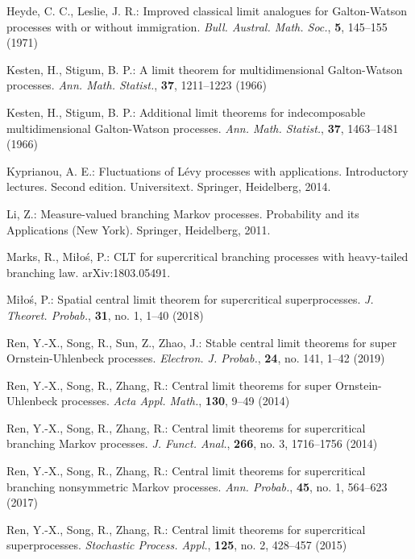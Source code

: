 \documentclass{amse-new}
\numberwithin{equation}{section}
\begin{document}
\begin{thebibliography}{99}
	Heyde, C. C., Leslie, J. R.: 
  	Improved classical limit analogues for {G}alton-{W}atson processes with or without immigration.
	\emph{Bull. Austral. Math. Soc.}, \textbf{5}, 145--155 (1971)

 	Kesten, H., Stigum, B. P.: 
  	A limit theorem for multidimensional {G}alton-{W}atson processes.
	\emph{Ann. Math. Statist.}, \textbf{37}, 1211--1223 (1966)

  	Kesten, H., Stigum, B. P.: 
  	Additional limit theorems for indecomposable multidimensional {G}alton-{W}atson processes.
	\emph{Ann. Math. Statist.}, \textbf{37}, 1463--1481 (1966)

  	Kyprianou, A. E.: 
  	Fluctuations of {L}\'{e}vy processes with applications.
	Introductory lectures. Second edition. Universitext. Springer, Heidelberg, 2014.

  	Li, Z.: 
  	Measure-valued branching {M}arkov processes.
  	Probability and its Applications (New York). Springer, Heidelberg, 2011.

  	Marks, R., Mi{\l}o{\'s}, P.: 
  	C{LT} for supercritical branching processes with heavy-tailed branching law.
  	arXiv:1803.05491.

  	Mi{\l}o{\'s}, P.: 
  	Spatial central limit theorem for supercritical superprocesses.
	\emph{J. Theoret. Probab.}, \textbf{31}, no. 1, 1--40 (2018)

	Ren, Y.-X., Song, R., Sun, Z., Zhao, J.: 
	Stable central limit theorems for super Ornstein-Uhlenbeck processes.
	\emph{Electron. J. Probab.}, \textbf{24}, no. 141, 1--42 (2019)

  	Ren, Y.-X., Song, R., Zhang, R.: 
  	Central limit theorems for super {O}rnstein-{U}hlenbeck processes.
	\emph{Acta Appl. Math.}, \textbf{130}, 9--49 (2014)

  	Ren, Y.-X., Song, R., Zhang, R.: 
  	Central limit theorems for supercritical branching {M}arkov processes.
	\emph{J. Funct. Anal.}, \textbf{266}, no. 3, 1716--1756 (2014)

  	Ren, Y.-X., Song, R., Zhang, R.: 
  	Central limit theorems for supercritical branching nonsymmetric {M}arkov processes.
	\emph{Ann. Probab.}, \textbf{45}, no. 1, 564--623 (2017)

  	Ren, Y.-X., Song, R., Zhang, R.: 
  	Central limit theorems for supercritical superprocesses.
	\emph{Stochastic Process. Appl.}, \textbf{125}, no. 2, 428--457 (2015)

\end{thebibliography}
\end{document}
